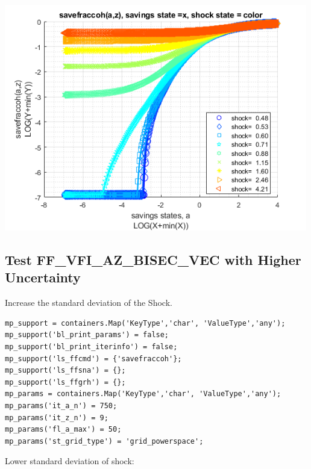 \documentclass[
]{book}
\begin{document}
\includegraphics[width=5.20833in,height=\textheight]{img/fx_vfi_az_bisec_vec_images/figure_5.png}

\hypertarget{test-ff_vfi_az_bisec_vec-with-higher-uncertainty}{%
\subsection{Test FF\_VFI\_AZ\_BISEC\_VEC with Higher Uncertainty}\label{test-ff_vfi_az_bisec_vec-with-higher-uncertainty}}

Increase the standard deviation of the Shock.

\begin{verbatim}
mp_support = containers.Map('KeyType','char', 'ValueType','any');
mp_support('bl_print_params') = false;
mp_support('bl_print_iterinfo') = false;
mp_support('ls_ffcmd') = {'savefraccoh'};
mp_support('ls_ffsna') = {};
mp_support('ls_ffgrh') = {};
mp_params = containers.Map('KeyType','char', 'ValueType','any');
mp_params('it_a_n') = 750;
mp_params('it_z_n') = 9;
mp_params('fl_a_max') = 50;
mp_params('st_grid_type') = 'grid_powerspace';
\end{verbatim}

Lower standard deviation of shock:
\end{document}
